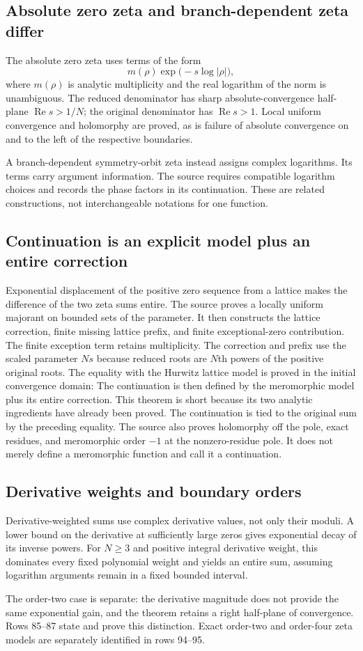 \subsection{Absolute zero zeta and branch-dependent zeta differ}
The absolute zero zeta uses terms of the form
\[
 m(\rho)\exp\bigl(-s\log |\rho|\bigr),
\]
where $m(\rho)$ is analytic multiplicity and the real logarithm of the norm is unambiguous. The reduced denominator has sharp absolute-convergence half-plane $\operatorname{Re}s>1/N$; the original denominator has $\operatorname{Re}s>1$. Local uniform convergence and holomorphy are proved, as is failure of absolute convergence on and to the left of the respective boundaries.

A branch-dependent symmetry-orbit zeta instead assigns complex logarithms. Its terms carry argument information. The source requires compatible logarithm choices and records the phase factors in its continuation. These are related constructions, not interchangeable notations for one function.

\subsection{Continuation is an explicit model plus an entire correction}
Exponential displacement of the positive zero sequence from a lattice makes the difference of the two zeta sums entire. The source proves a locally uniform majorant on bounded sets of the parameter. It then constructs the lattice correction, finite missing lattice prefix, and finite exceptional-zero contribution.
The finite exception term retains multiplicity. The correction and prefix use the scaled parameter $Ns$ because reduced roots are $N$th powers of the positive original roots. The equality with the Hurwitz lattice model is proved in the initial convergence domain:
The continuation is then defined by the meromorphic model plus its entire correction.
This theorem is short because its two analytic ingredients have already been proved. The continuation is tied to the original sum by the preceding equality. The source also proves holomorphy off the pole, exact residues, and meromorphic order $-1$ at the nonzero-residue pole. It does not merely define a meromorphic function and call it a continuation.

\subsection{Derivative weights and boundary orders}
Derivative-weighted sums use complex derivative values, not only their moduli. A lower bound on the derivative at sufficiently large zeros gives exponential decay of its inverse powers. For $N\geq3$ and positive integral derivative weight, this dominates every fixed polynomial weight and yields an entire sum, assuming logarithm arguments remain in a fixed bounded interval.

The order-two case is separate: the derivative magnitude does not provide the same exponential gain, and the theorem retains a right half-plane of convergence. Rows 85--87 state and prove this distinction. Exact order-two and order-four zeta models are separately identified in rows 94--95.
